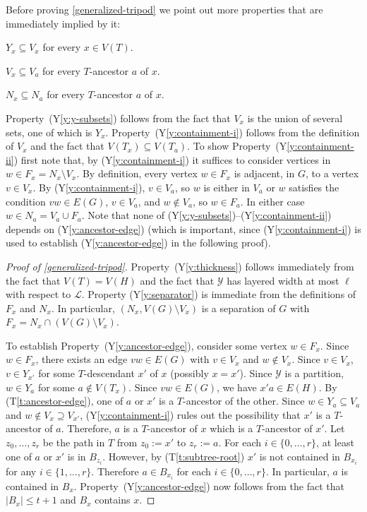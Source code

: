 \documentclass{patmorin}
\newcommand{\tref}[1]{(T\ref{t:#1})}
\newcommand{\ylabel}[1]{\label{y:#1}}
\newcommand{\yref}[1]{(Y\ref{y:#1})}
\renewcommand{\le}{\leqslant}
\begin{document}
Before proving \cref{generalized-tripod} we point out more properties that are immediately implied by it:

\begin{compactenum}[(Y1)]\setcounter{enumi}{3}
  \item\ylabel{y-subsets} $Y_x\subseteq V_x$ for every $x\in V(T)$. 
  \item\ylabel{containment-i} $V_x\subseteq V_a$ for every $T$-ancestor $a$ of $x$. 
  \item\ylabel{containment-ii}$N_x\subseteq N_a$ for every $T$-ancestor $a$ of $x$.
\end{compactenum}

Property~\yref{y-subsets} follows from the fact that $V_x$ is the union of several sets, one of which is $Y_x$.  Property~\yref{containment-i} follows from the definition of $V_x$ and the fact that $V(T_x)\subseteq V(T_a)$. To show Property~\yref{containment-ii} first note that, by \yref{containment-i} it suffices to consider vertices in $w\in F_x=N_x\setminus V_x$. By definition, every vertex $w\in F_x$ is adjacent, in $G$, to a vertex $v\in V_x$.  By \yref{containment-i}, $v\in V_a$, so $w$ is either in $V_a$ or $w$ satisfies the condition $vw\in E(G)$, $v\in V_a$, and $w\not\in V_a$, so $w\in F_a$.  In either case $w\in N_a=V_a\cup F_a$.  Note that none of \yref{y-subsets}--\yref{containment-ii} depends on \yref{ancestor-edge} (which is important, since \yref{containment-i} is used to establish \yref{ancestor-edge} in the following proof).


\begin{proof}[Proof of \cref{generalized-tripod}]
  Property~\yref{thickness} follows immediately from the fact that $V(T)=V(H)$
  and the fact that $\mathcal{Y}$ has layered width at most $\ell$ with respect to $\mathcal{L}$.  Property \yref{separator} is immediate from the definitions of $F_x$ and $N_x$.  In particular, $(N_x,V(G)\setminus V_x)$ is a separation of $G$ with $F_x=N_x\cap(V(G)\setminus V_x)$. 

  To establish Property~\yref{ancestor-edge}, consider some vertex $w\in F_x$.  Since $w\in F_x$, there exists an edge $vw\in E(G)$ with $v\in V_x$ and $w\not\in V_x$.  Since $v\in V_x$, $v\in Y_{x'}$ for some $T$-descendant $x'$ of $x$ (possibly $x=x'$). Since $\mathcal{Y}$ is a partition, $w\in Y_{a}$ for some $a\not\in V(T_x)$.  Since $vw\in E(G)$, we have $x'a\in E(H)$.  By \tref{ancestor-edge}, one of $a$ or $x'$ is a $T$-ancestor of the other. Since $w\in Y_a\subseteq V_a$ and $w\not\in V_x\supseteq V_{x'}$, \yref{containment-i} rules out the possibility that $x'$ is a $T$-ancestor of $a$. Therefore, $a$ is a $T$-ancestor of $x$ which is a $T$-ancestor of $x'$.  Let $z_0,\ldots,z_r$ be the path in $T$ from $z_0:=x'$ to $z_r:=a$.  For each $i\in\{0,\ldots,r\}$, at least one of $a$ or $x'$ is in $B_{z_i}$.  However, by \tref{subtree-root} $x'$ is not contained in $B_{x_i}$ for any $i\in\{1,\ldots,r\}$.  Therefore $a\in B_{x_i}$ for each $i\in\{0,\ldots,r\}$.  In particular, $a$ is contained in $B_x$.
  Property~\yref{ancestor-edge} now follows from the fact that $|B_x|\le t+1$ and $B_x$ contains $x$.
\end{proof}
\end{document}
